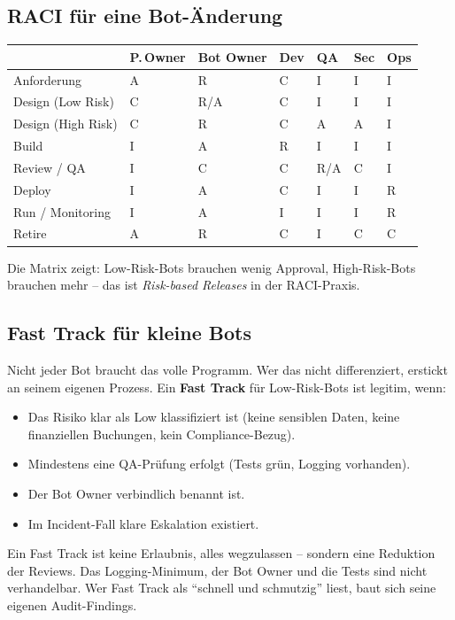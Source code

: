 \documentclass[11pt,a4paper,oneside]{article}
\newcommand{\fachbegriff}[1]{\textbf{#1}}
\begin{document}
\subsection{RACI für eine Bot-Änderung}

\begin{tabularx}{\linewidth}{@{}l X X X X X X@{}}
\toprule
& \textbf{P.\,Owner} & \textbf{Bot Owner} & \textbf{Dev} & \textbf{QA} & \textbf{Sec} & \textbf{Ops} \\
\midrule
Anforderung & A & R & C & I & I & I \\
Design (Low Risk) & C & R/A & C & I & I & I \\
Design (High Risk) & C & R & C & A & A & I \\
Build & I & A & R & I & I & I \\
Review / QA & I & C & C & R/A & C & I \\
Deploy & I & A & C & I & I & R \\
Run / Monitoring & I & A & I & I & I & R \\
Retire & A & R & C & I & C & C \\
\bottomrule
\end{tabularx}

\medskip

\noindent Die Matrix zeigt: Low-Risk-Bots brauchen wenig Approval, High-Risk-Bots brauchen mehr -- das ist \emph{Risk-based Releases} in der RACI-Praxis.

\subsection{Fast Track für kleine Bots}

Nicht jeder Bot braucht das volle Programm. Wer das nicht differenziert, erstickt an seinem eigenen Prozess. Ein \fachbegriff{Fast Track} für Low-Risk-Bots ist legitim, wenn:

\begin{itemize}
  \item Das Risiko klar als Low klassifiziert ist (keine sensiblen Daten, keine finanziellen Buchungen, kein Compliance-Bezug).
  \item Mindestens eine QA-Prüfung erfolgt (Tests grün, Logging vorhanden).
  \item Der Bot Owner verbindlich benannt ist.
  \item Im Incident-Fall klare Eskalation existiert.
\end{itemize}

\begin{merkbox}
Ein Fast Track ist keine Erlaubnis, alles wegzulassen -- sondern eine Reduktion der Reviews. Das Logging-Minimum, der Bot Owner und die Tests sind nicht verhandelbar. Wer Fast Track als ``schnell und schmutzig'' liest, baut sich seine eigenen Audit-Findings.
\end{merkbox}
\end{document}

